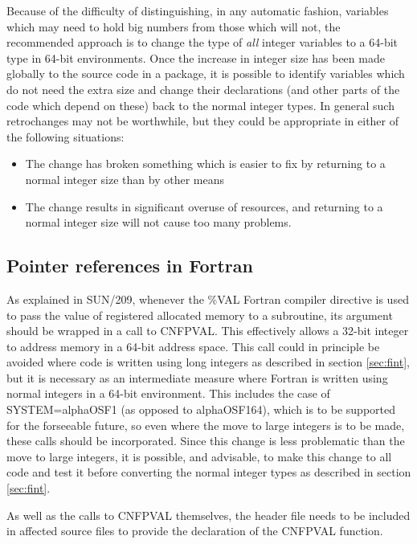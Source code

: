 \documentclass[twoside,11pt]{article}
\newcommand{\xref}[3]{#1}
\renewcommand{\_}{\texttt{\symbol{95}}}
\begin{document}
Because of the difficulty of distinguishing, in any automatic fashion,
variables which may 
need to hold big numbers from those which will not,
the recommended approach is to change the type of {\em all\/} 
integer variables to a 64-bit type in 64-bit environments.
Once the increase in integer size has been made 
globally to the source code in a package,
it is possible to identify variables which do not need the extra size
and change their declarations (and other parts of the code which depend
on these) back to the normal integer types.
In general such retrochanges may not be worthwhile, 
but they could be appropriate in either of the following situations:
\begin{itemize}
\item
The change has broken something which is easier to fix by returning to 
a normal integer size than by other means
\item
The change results in significant overuse of resources, 
and returning to a normal
integer size will not cause too many problems.
\end{itemize}


\subsection{Pointer references in Fortran}

As explained in \xref{SUN/209}{sun209}{pointers},
whenever the \%VAL Fortran compiler directive 
is used to pass the value of registered allocated
memory to a subroutine, its argument should be wrapped in a call
to \xref{CNF\_PVAL}{sun209}{CNF\_PVAL}.  This effectively allows
a 32-bit integer to address memory in a 64-bit address space.
This call could in principle be avoided 
where code is written using long integers as
described in section \ref{sec:fint}, but it is necessary as an intermediate
measure where Fortran is written using normal integers in a
64-bit environment.
This includes the case of SYSTEM=alpha\_OSF1 (as opposed to alpha\_OSF1\_64),
which is to be supported for the forseeable future, so even where the
move to large integers is to be made, these calls should be incorporated.
Since this change is less problematic than the move to large integers,
it is possible, and advisable, to make this
change to all code and test it before converting the normal integer types
as described in section \ref{sec:fint}.  

As well as the calls to CNF\_PVAL themselves, 
the header file \file{CNF\_PAR} needs to be included
in affected source files to provide the declaration of the CNF\_PVAL function.
\end{document}
